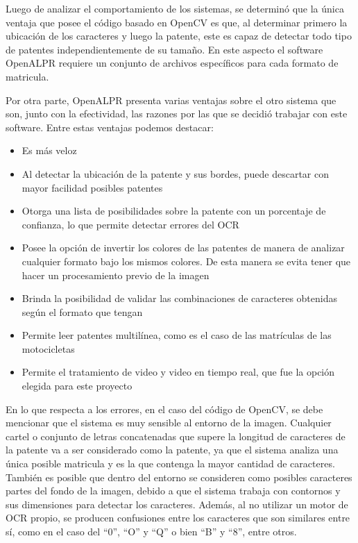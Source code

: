 Luego de analizar el comportamiento de los sistemas, se determinó que la única ventaja que posee el código basado en OpenCV es que, al determinar primero la ubicación de los caracteres y luego la patente, este es capaz de detectar todo tipo de patentes independientemente de su tamaño. En este aspecto el software OpenALPR requiere un conjunto de archivos específicos para cada formato de matricula.

Por otra parte, OpenALPR presenta varias ventajas sobre el otro sistema que son, junto con la efectividad, las razones por las que se decidió trabajar con este software. Entre estas ventajas podemos destacar:	
	
\begin{itemize}
	\item Es más veloz
	\item Al detectar la ubicación de la patente y sus bordes, puede descartar con mayor facilidad posibles patentes
	\item Otorga una lista de posibilidades sobre la patente con un porcentaje de confianza, lo que permite detectar errores del OCR
	\item Posee la opción de invertir los colores de las patentes de manera de analizar cualquier formato bajo los mismos colores. De esta manera se evita tener que hacer un procesamiento previo de la imagen
	\item Brinda la posibilidad de validar las combinaciones de caracteres obtenidas según el formato que tengan
	\item Permite leer patentes multilínea, como es el caso de las matrículas de las motocicletas
	\item Permite el tratamiento de video y video en tiempo real, que fue la opción elegida para este proyecto
\end{itemize}	

En lo que respecta a los errores, en el caso del código de OpenCV, se debe mencionar que el sistema es muy sensible al entorno de la imagen. Cualquier cartel o conjunto de letras concatenadas que supere la longitud de caracteres de la patente va a ser considerado como la patente, ya que el sistema analiza una única posible matricula y es la que contenga la mayor cantidad de caracteres. También es posible que dentro del entorno se consideren como posibles caracteres partes del fondo de la imagen, debido a que el sistema trabaja con contornos y sus dimensiones para detectar los caracteres. Además, al no utilizar un motor de OCR propio, se producen confusiones entre los caracteres que son similares entre sí, como en el caso del ``0'', ``O'' y ``Q'' o bien ``B'' y ``8'', entre otros.	
	
